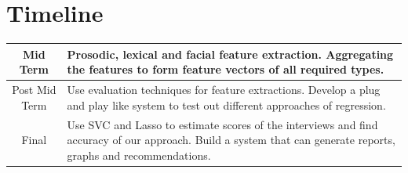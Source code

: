 \documentclass[11pt]{article}
\begin{document}
\newpage
\section{Timeline}
\begin{table}[h!]
    \begin{tabular}{ | c | p{13cm} | }
	\hline
        Mid Term & Prosodic, lexical and facial feature extraction. \newline Aggregating the features to form feature vectors of all required types. \newline \\
	\hline
        Post Mid Term &  Use evaluation techniques for feature extractions. \newline Develop a plug and play like system to test out different approaches of regression.\newline \\ 
        \hline
        Final & Use SVC and Lasso to estimate scores of the interviews and find accuracy of our approach. \newline Build a system that can generate reports, graphs and recommendations.\newline \\ 
        \hline
    \end{tabular} 
\end{table}



\end{document}
